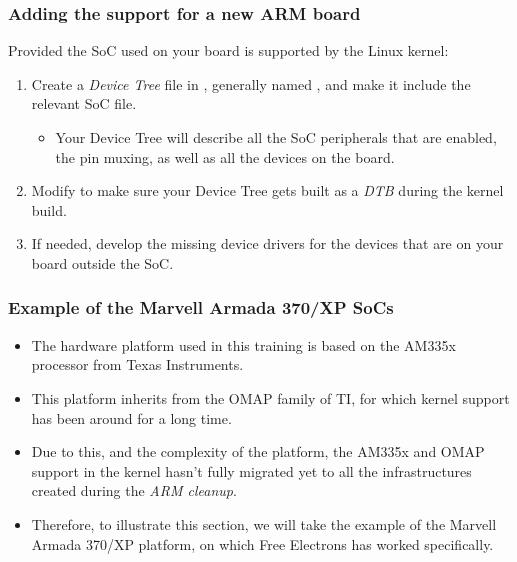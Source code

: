 \begin{frame}
  \frametitle{Adding the support for a new ARM board}
  Provided the SoC used on your board is supported by the Linux kernel:
  \begin{enumerate}
  \item Create a {\em Device Tree} file in ,
    generally named , and make it
    include the relevant SoC  file.
    \begin{itemize}
    \item Your Device Tree will describe all the SoC peripherals that
      are enabled, the pin muxing, as well as all the devices on the
      board.
    \end{itemize}
  \item Modify  to make sure your
    Device Tree gets built as a {\em DTB} during the kernel build.
  \item If needed, develop the missing device drivers for the devices
    that are on your board outside the SoC.
  \end{enumerate}
\end{frame}

\begin{frame}
  \frametitle{Example of the Marvell Armada 370/XP SoCs}
  \begin{itemize}
  \item The hardware platform used in this training is based on the
    AM335x processor from Texas Instruments.
  \item This platform inherits from the OMAP family of TI, for which
    kernel support has been around for a long time.
  \item Due to this, and the complexity of the platform, the AM335x
    and OMAP support in the kernel hasn't fully migrated yet to all
    the infrastructures created during the {\em ARM cleanup}.
  \item Therefore, to illustrate this section, we will take the
    example of the Marvell Armada 370/XP platform, on which Free
    Electrons has worked specifically.
  \end{itemize}
\end{frame}

